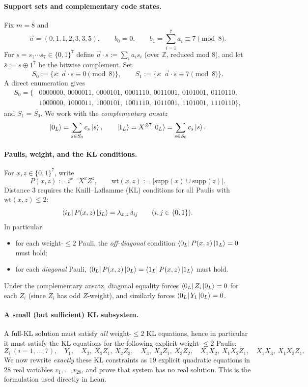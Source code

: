 \documentclass[11pt]{article}
\newcommand{\wt}{\mathrm{wt}}
\newcommand{\supp}{\mathrm{supp}}
\begin{document}
\paragraph{Support sets and complementary code states.}
Fix $m=8$ and
\[
\vec a=(0,1,1,2,3,3,5),\qquad b_0=0,\qquad b_1=\sum_{i=1}^7 a_i\equiv 7\pmod 8.
\]
For $s=s_1\cdots s_7\in\{0,1\}^7$ define $\vec a\cdot s:=\sum_i a_i s_i$ (over $\mathbb Z$, reduced mod $8$),
and let $\bar s:=s\oplus 1^7$ be the bitwise complement.
Set
\[
S_0:=\{s:\ \vec a\cdot s\equiv 0\pmod 8\},\qquad
S_1:=\{s:\ \vec a\cdot s\equiv 7\pmod 8\}.
\]
A direct enumeration gives
\[
\begin{aligned}
S_0=\{&
0000000,\ 0000011,\ 0000101,\ 0001110,\ 0011001,\ 0101001,\ 0110110,\\
&1000000,\ 1000011,\ 1000101,\ 1001110,\ 1011001,\ 1101001,\ 1110110\},
\end{aligned}
\]
and $S_1=\overline{S_0}$.
We work with the \emph{complementary ansatz}
\[
\ket{0_L}=\sum_{s\in S_0} c_s\ket{s},\qquad
\ket{1_L}=X^{\otimes 7}\ket{0_L}=\sum_{s\in S_0} c_s\ket{\bar s}.
\]

\paragraph{Paulis, weight, and the KL conditions.}
For $x,z\in\{0,1\}^7$, write
\[
P(x,z):=i^{x\cdot z}X^x Z^z,\qquad
\wt(x,z):=\bigl|\supp(x)\cup\supp(z)\bigr|.
\]
Distance $3$ requires the Knill--Laflamme (KL) conditions for all Paulis with $\wt(x,z)\le 2$:
\[
\bra{i_L}P(x,z)\ket{j_L}=\lambda_{x,z}\,\delta_{ij}\qquad(i,j\in\{0,1\}).
\]
In particular:
\begin{itemize}
\item for each weight-$\le2$ Pauli, the \emph{off-diagonal} condition $\bra{0_L}P(x,z)\ket{1_L}=0$ must hold;
\item for each \emph{diagonal} Pauli, $\bra{0_L}P(x,z)\ket{0_L}=\bra{1_L}P(x,z)\ket{1_L}$ must hold.
\end{itemize}
Under the complementary ansatz, diagonal equality forces $\bra{0_L}Z_i\ket{0_L}=0$ for each $Z_i$
(since $Z_i$ has odd $Z$-weight), and similarly forces $\bra{0_L}Y_1\ket{0_L}=0$.

\paragraph{A small (but sufficient) KL subsystem.}
A full-KL solution must satisfy \emph{all} weight-$\le2$ KL equations, hence in particular it must satisfy
the KL equations for the following explicit weight-$\le2$ Paulis:
\[
Z_i\ (i=1,\dots,7),\quad Y_1,\quad
X_2,\ X_2Z_1,\ X_2Z_3,\quad
X_3,\ X_3Z_1,\ X_3Z_2,\quad
X_1X_2,\ X_1X_2Z_1,\quad
X_1X_3,\ X_1X_3Z_1.
\]
We now rewrite \emph{exactly} these KL constraints as $19$ explicit quadratic equations
in $28$ real variables $v_1,\dots,v_{28}$, and prove that system has no real solution.
This is the formulation used directly in Lean.
\end{document}
